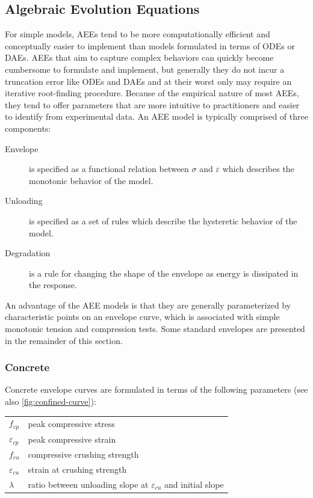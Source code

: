 \subsection{Algebraic Evolution Equations}\label{sec:aees}
For simple models, AEEs tend to be more computationally efficient
and conceptually easier to implement than models formulated in terms of ODEs
or DAEs. AEEs that aim to capture complex behaviors can quickly become
cumbersome to formulate and implement, but generally they do not incur
a truncation error like ODEs and DAEs and at their worst only may require an iterative root-finding procedure.
Because of the empirical nature of most AEEs, they tend to offer parameters that are more intuitive to practitioners and easier to identify from experimental data.
%
An AEE model is typically comprised of three components:
\begin{description}
    \item[Envelope] is specified as a functional relation between $\sigma$ and $\varepsilon$ which describes the monotonic behavior of the model.
    \item[Unloading] is specified as a set of rules which describe the hysteretic
    behavior of the model.
    \item[Degradation] is a rule for changing the shape of the envelope
    as energy is dissipated in the response.
\end{description}
%
An advantage of the AEE models is that they are generally parameterized by characteristic points on an envelope curve, which is associated with simple monotonic tension and compression tests.
Some standard envelopes are presented in the remainder of this section.

\subsubsection{Concrete}\label{sec:concrete}
Concrete envelope curves are formulated in terms of the following parameters (see also \cref{fig:confined-curve}):
\begin{table}[H]
\centering
\begin{tabular}{ll}
\toprule
\(f_{cp}\) & peak compressive stress \\
\(\varepsilon_{cp}\) & peak compressive strain \\
\(f_{cu}\) & compressive crushing strength \\
\(\varepsilon_{cu}\) & strain at crushing strength \\
\(\lambda\) & ratio between unloading slope at $\varepsilon_{cu}$ and
initial slope \\
\bottomrule
\end{tabular}
\end{table}

